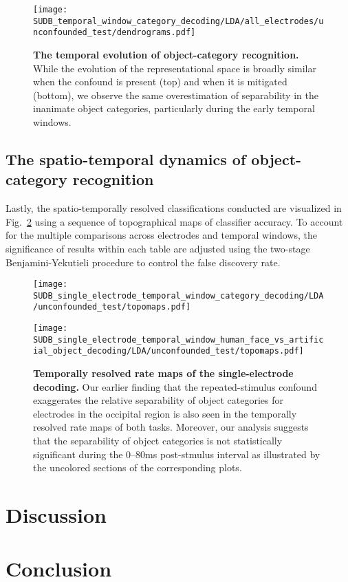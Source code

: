 \begin{figure}
    \centering
    \texttt{[image: SUDB\_temporal\_window\_category\_decoding/LDA/all\_electrodes/unconfounded\_test/dendrograms.pdf]}        
    \caption{\textbf{The temporal evolution of object-category recognition.} While the evolution of the representational space is broadly similar when the confound is present (top) and when it is mitigated (bottom), we observe the same overestimation of separability in the inanimate object categories, particularly during the early temporal windows.\label{fig:category-temporal-dendrograms}}
\end{figure}

\subsection{The spatio-temporal dynamics of object-category recognition}
Lastly, the spatio-temporally resolved classifications conducted are visualized in Fig.~\ref{fig:category-spatiotemporal} using a sequence of topographical maps of classifier accuracy. To account for the multiple comparisons across electrodes and temporal windows, the significance of results within each table are adjusted using the two-stage Benjamini-Yekutieli procedure to control the false discovery rate.

\begin{figure}
    \centering
    \centering
    \begin{minipage}{\columnwidth} 
        \texttt{[image: SUDB\_single\_electrode\_temporal\_window\_category\_decoding/LDA/unconfounded\_test/topomaps.pdf]}   
    \end{minipage}
    \hfill
    \begin{minipage}{\columnwidth} 
        \texttt{[image: SUDB\_single\_electrode\_temporal\_window\_human\_face\_vs\_artificial\_object\_decoding/LDA/unconfounded\_test/topomaps.pdf]}  
    \end{minipage}
    
          
    \caption{\textbf{Temporally resolved rate maps of the single-electrode decoding.} Our earlier finding that the repeated-stimulus confound exaggerates the relative separability of object categories for electrodes in the occipital region is also seen in the temporally resolved rate maps of both tasks. Moreover, our analysis suggests that the separability of object categories is not statistically significant during the 0--80ms post-stmulus interval as illustrated by the uncolored sections of the corresponding plots.\label{fig:category-spatiotemporal}}
\end{figure}


\section{Discussion}


\section{Conclusion}